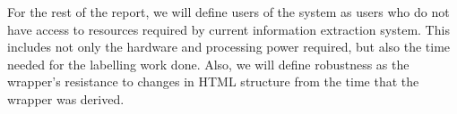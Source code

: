 For the rest of the report, we will define users of the system as users who do not have access 
to resources required by current information extraction system. This includes not only the 
hardware and processing power required, but also the time needed for the labelling work done.
Also, we will define robustness as the wrapper's resistance to changes in HTML structure from
the time that the wrapper was derived.